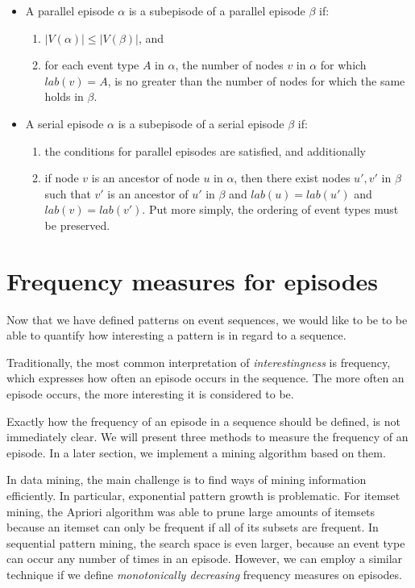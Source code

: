 \begin{itemize}
\item A parallel episode $ \alpha $ is a subepisode of a parallel episode $ \beta $ if:
\begin{enumerate}
\item $ | V(\alpha) | \leq | V(\beta) | $, and
\item for each event type $ A $ in $ \alpha $, the number of nodes $ v $ in $ \alpha $ for which $ lab(v) = A $, is no greater than the number of nodes for which the same holds in $ \beta $.
\end{enumerate}
\item A serial episode $ \alpha $ is a subepisode of a serial episode $ \beta $ if:
\begin{enumerate}
\item the conditions for parallel episodes are satisfied, and additionally
\item if node $ v $ is an ancestor of node $ u $ in $ \alpha $, then there exist nodes $ u', v' $ in $ \beta $ such that $ v' $ is an ancestor of $ u' $ in $ \beta $ and $ lab(u) = lab(u') $ and $ lab(v) = lab(v') $. Put more simply, the ordering of event types must be preserved.
\end{enumerate}
\end{itemize}

\section{Frequency measures for episodes}
\label{sec:interestingness-measures-episodes}

Now that we have defined patterns on event sequences, we would like to be to be able to quantify how interesting a pattern is in regard to a sequence.

Traditionally, the most common interpretation of \emph{interestingness} is frequency, which expresses how often an episode occurs in the sequence. The more often an episode occurs, the more interesting it is considered to be.

Exactly how the frequency of an episode in a sequence should be defined, is not immediately clear. We will present three methods to measure the frequency of an episode. In a later section, we implement a mining algorithm based on them.

In data mining, the main challenge is to find ways of mining information efficiently. In particular, exponential pattern growth is problematic. For itemset mining, the Apriori algorithm \cite{agrawal1994fast} was able to prune large amounts of itemsets because an itemset can only be frequent if all of its subsets are frequent. In sequential pattern mining, the search space is even larger, because an event type can occur any number of times in an episode. However, we can employ a similar technique if we define \emph{monotonically decreasing} frequency measures on episodes.

